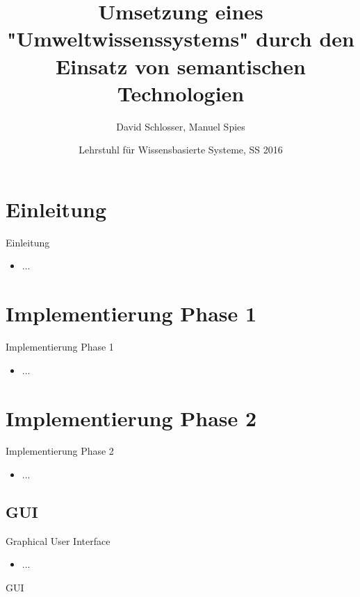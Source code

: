 \documentclass[aspectratio=169]{beamer}
\title[Umwelt PG]{%
  Umsetzung eines "Umweltwissenssystems" durch den Einsatz von semantischen Technologien}
\subtitle{}
\author[David Schlosser, Manuel Spies]{%
  David Schlosser, Manuel Spies}
\date[Lehrstuhl für Wissensbasierte Systeme, SS 2016]{Lehrstuhl für Wissensbasierte Systeme, SS 2016}
\begin{document}
\begin{frame}
  \maketitle
\end{frame}

\section{Einleitung}

\begin{frame}{Einleitung}
  \begin{itemize}
    \item ...
  \end{itemize}
\end{frame}

\section{Implementierung Phase 1}

\begin{frame}{Implementierung Phase 1}
  \begin{itemize}
  	\item ...
  \end{itemize}
\end{frame}

\section{Implementierung Phase 2}

\begin{frame}{Implementierung Phase 2}
  \begin{itemize}
  	\item ...
  \end{itemize}
\end{frame}

\subsection{GUI}

\begin{frame}{Graphical User Interface}
  \begin{itemize}
  	\item ...
  \end{itemize}
\end{frame}

\begin{frame}{GUI}
\end{frame}
\end{document}
